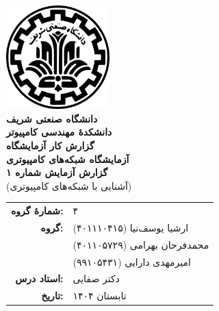 \documentclass[12pt]{article}
\newcommand{\persianordinal}[1]{%
	\ifcase#1
	\or اول%
	\or دوم%
	\or سوم%
	\or چهارم%
	\or پنجم%
	\or ششم%
	\or هفتم%
	\or هشتم%
	\or نهم%
	\or دهم%
	\or یازدهم%
	\or دوازدهم%
	\or سیزدهم%
	\or چهاردهم%
	\or پانزدهم%
	\or شانزدهم%
	\or هفدهم%
	\or هجدهم%
	\or نوزدهم%
	\or بیستم%
	\else #1\fi
}
\newcommand{\persianordinalpage}{\persianfont\persianordinal{\value{page}}}
\begin{document}
	
	\begin{titlepage}
		\centering
		\vspace*{1cm}
		\includegraphics[width=4cm]{sharif.png}\\[1.5cm]
		{\Large\textbf{دانشگاه صنعتی شریف}}\\[0.5cm]
		{\large\textbf{دانشکدهٔ مهندسی کامپیوتر}}\\[1.5cm]
		{\Huge\textbf{گزارش کار آزمایشگاه}}\\[0.5cm]
		{\LARGE\textbf{آزمایشگاه شبکه‌های کامپیوتری}}\\[2cm]
		
		\textbf{گزارش آزمایش شماره ۱}\\
		(آشنایی با شبکه‌های کامپیوتری)
		
		\vfill
		\begin{tabular}{rl}
			\textbf{شمارهٔ گروه:} & ۴ \\
			\textbf{گروه:} &
			ارشیا یوسف‌نیا (۴۰۱۱۱۰۴۱۵) \\
			& محمد‌فرحان بهرامی (۴۰۱۱۰۵۷۲۹) \\
			& امیرمهدی دارایی (۹۹۱۰۵۴۳۱) \\
			\textbf{استاد درس:} & دکتر صفایی \\
			\textbf{تاریخ:} & تابستان ۱۴۰۴ \\
		\end{tabular}
	\end{titlepage}
	
	\clearpage
	\setcounter{page}{1}
	\renewcommand{\thepage}{\persianordinalpage}
	
	\tableofcontents
	\clearpage
	\listoftables
	
	\clearpage
	\setcounter{page}{1}
	\renewcommand{\thepage}{\persianfont\arabic{page}}
	
	
\end{document}
